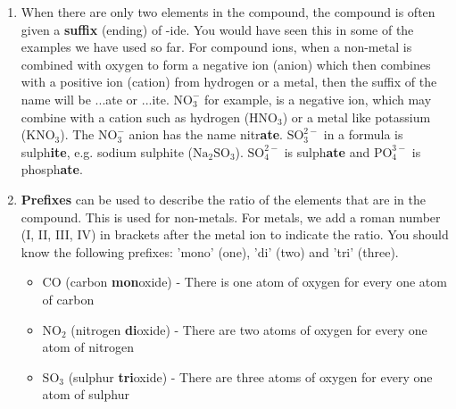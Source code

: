 \begin{enumerate}[noitemsep, label=\textbf{\arabic*}. ]
\begin{table}[H]
\begin{center}
 \end{center}
\caption{Table of anions}
\label{tab:anions}
\end{table}

    \par
  \label{m38708*uid42}\item When there are only two elements in the compound, the compound is often given a \textbf{suffix} (ending) of -ide. You would have seen this in some of the examples we have used so far. For compound ions, when a non-metal is combined with oxygen to form a negative ion (anion) which then combines with a positive ion (cation) from hydrogen or a metal, then the suffix of the name will be ...ate or ...ite. $\text{NO}_{3}^{-}$ for example, is a negative ion, which may combine with a cation such as hydrogen ($\text{HNO}{}_{3}$) or a metal like potassium (KNO$_\text{3}$). The $\text{NO}_{3}^{-}$ anion has the name nitr\textbf{ate}. $\text{SO}_{3}^{2-}$ in a formula is sulph\textbf{ite}, e.g. sodium sulphite ($\text{Na}{}_{2}\text{SO}{}_{3}$).\newline
     $\text{SO}_{4}^{2-}$ is sulph\textbf{ate} and $\text{PO}_{4}^{3-}$ is phosph\textbf{ate}.
\label{m38708*uid43}\item \textbf{Prefixes} can be used to describe the ratio of the elements that are in the compound. This is used for non-metals. For metals, we add a roman number (I, II, III, IV) in brackets after the metal ion to indicate the ratio. You should know the following prefixes: 'mono' (one), 'di' (two) and 'tri' (three).
\label{m38708*id64977}\begin{itemize}[noitemsep]
            \label{m38708*uid44}\item $\text{CO}$ (carbon \textbf{mon}oxide) - There is one atom of oxygen for every one atom of carbon
\label{m38708*uid45}\item $\text{NO}{}_{2}$ (nitrogen \textbf{di}oxide) - There are two atoms of oxygen for every one atom of nitrogen
\label{m38708*uid46}\item $\text{SO}{}_{3}$ (sulphur \textbf{tri}oxide) - There are three atoms of oxygen for every one atom of sulphur
\end{itemize}
        \end{enumerate}
